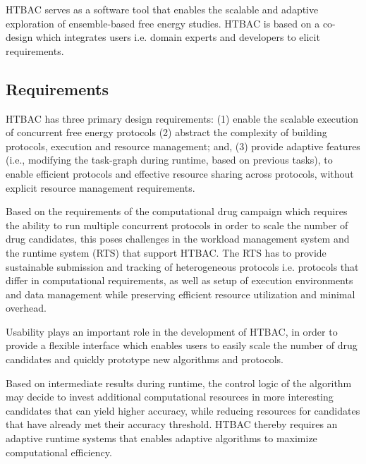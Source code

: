 HTBAC serves as a software tool that enables the scalable and adaptive exploration 
of ensemble-based free energy studies. HTBAC is based on a 
co-design which integrates users i.e. domain experts and developers to elicit
requirements. 




\subsection{Requirements}

HTBAC has three primary design requirements\@: (1) enable the scalable
execution of concurrent free energy protocols (2) abstract the complexity of 
building protocols, execution and resource management; and, (3) provide adaptive 
features (i.e., modifying the task-graph during runtime, based on previous tasks), 
to enable efficient protocols and effective resource sharing across protocols, 
without explicit resource management requirements.

Based on the requirements of the computational drug campaign which requires the 
ability to run multiple concurrent protocols in order to scale the number of 
drug candidates, this poses challenges in the 
workload management system and the runtime system (RTS) that support HTBAC. The 
RTS has to provide sustainable submission and tracking of heterogeneous protocols 
i.e. protocols that differ in computational requirements, as well as 
setup of execution environments and data management while preserving 
efficient resource utilization and minimal overhead. 

Usability plays an important role in the development of HTBAC, in order to  provide
a flexible interface which enables users to easily scale the number of drug 
candidates and quickly prototype new algorithms and protocols. 

Based on intermediate results during runtime, the control logic of the algorithm 
may decide to invest additional computational resources in more interesting  
candidates that can yield higher accuracy, while reducing resources for candidates
that have already met their accuracy threshold. HTBAC thereby requires an 
adaptive runtime systems that enables adaptive algorithms to maximize 
computational efficiency. 


